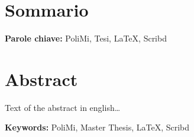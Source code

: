 %
%
\cleardoublepage
%
%
%
\begingroup
\let\cleardoublepage\relax
\let\cleardoublepage\relax
%
\chapter*{Sommario}
%
\lipsum[1-2]

\medskip
%
\noindent \textbf{Parole chiave:} 
PoliMi,
Tesi,
LaTeX,
Scribd
%
\clearpage
%
%
%
%
\chapter*{Abstract}
%
Text of the abstract in english\dots\\
\lipsum[1-2]

\medskip
%
\noindent \textbf{Keywords:} 
PoliMi,
Master Thesis,
LaTeX,
Scribd
%
%
%
\endgroup			
%
%
